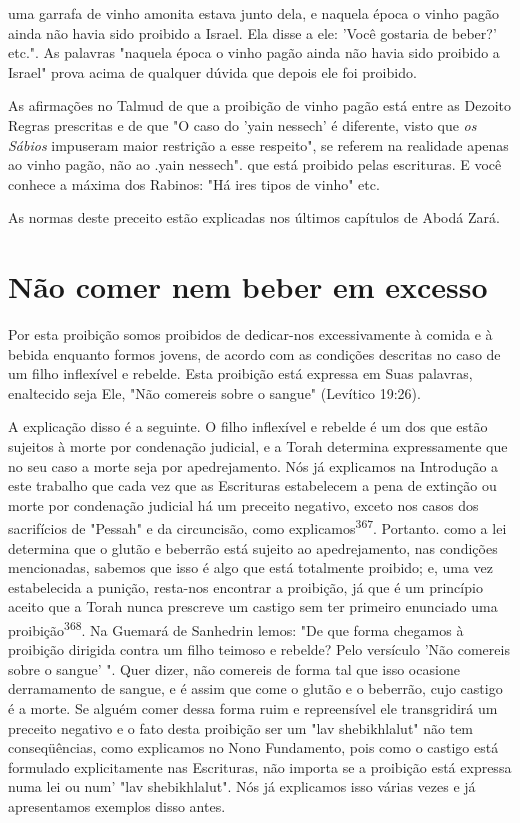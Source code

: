 \begin{itemize}
\begin{enumrate}
\begin{itemize}
\begin{itemize}
\begin{itemize}
uma garrafa de vinho amonita estava junto dela, e naquela época o vinho
pagão ainda não havia sido proibido a Israel. Ela disse a ele: 'Você
gostaria de beber?' etc.". As palavras "naquela época o vinho pagão
ainda não havia sido proibido a Israel" prova acima de qualquer dúvida
que depois ele foi proibido.

As afirmações no Talmud de que a proibição de vinho pagão está entre as
Dezoito Regras prescritas e de que "O caso do 'yain nessech' é
diferen­te, visto que \emph{os Sábios} impuseram maior restrição a esse
respeito", se referem na realidade apenas ao vinho pagão, não ao
.yain nessech". que está proibido pelas escrituras. E
você conhece a máxima dos Rabinos: "Há ires tipos de vi­nho" etc.

As normas deste preceito estão explicadas nos últimos capítulos de Abodá
Zará.

\section{Não comer nem beber em excesso}

Por esta proibição somos proibidos de dedicar-nos excessivamente à
comida e à bebida enquanto formos jovens, de acordo com as condições
des­critas no caso de um filho inflexível e rebelde. Esta proibição está
expressa em Suas palavras, enaltecido seja Ele, "Não comereis sobre o
sangue" (Levítico 19:26).

A explicação disso é a seguinte. O filho inflexível e rebelde é um dos
que estão sujeitos à morte por condenação judicial, e a Torah determina
ex­pressamente que no seu caso a morte seja por
apedrejamento. Nós já expli­camos na Introdução a este
trabalho que cada vez que as Escrituras estabele­cem a pena de extinção
ou morte por condenação judicial há um preceito ne­gativo, exceto nos
casos dos sacrifícios de "Pessah" e da circuncisão, como
explicamos\textsuperscript{367}. Portanto. como a lei determina que o
glutão e beberrão está su­jeito ao apedrejamento, nas condições
mencionadas, sabemos que isso é algo que está totalmente proibido; e,
uma vez estabelecida a punição, resta-nos en­contrar a proibição, já que
é um princípio aceito que a Torah nunca prescreve um castigo sem ter
primeiro enunciado uma proibição\textsuperscript{368}. Na Guemará de
Sa­nhedrin lemos: "De que forma chegamos à proibição dirigida contra um
filho teimoso e rebelde? Pelo versículo 'Não comereis sobre o sangue' ".
Quer di­zer, não comereis de forma tal que isso ocasione derramamento de
sangue, e é assim que come o glutão e o beberrão, cujo castigo é a
morte. Se alguém co­mer dessa forma ruim e repreensível ele transgridirá
um preceito negativo e o fato desta proibição ser um "lav shebikhlalut"
não tem conseqüências, como explicamos no Nono Fundamento, pois como o
castigo está formulado explici­tamente nas Escrituras, não importa se a
proibição está expressa numa lei ou num' "lav shebikhlalut". Nós já
explicamos isso várias vezes e já apresentamos exemplos disso antes.



\end{itemize}
\end{itemize}
\end{itemize}
\end{enumrate}
\end{itemize}

